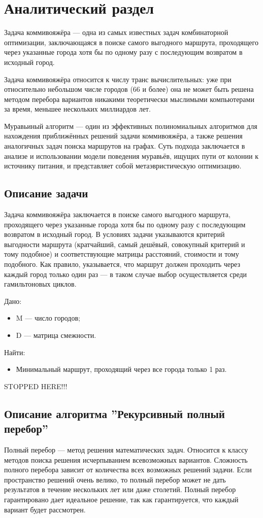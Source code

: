 \chapter{Аналитический раздел}
Задача коммивояжёра — одна из самых известных задач комбинаторной оптимизации, заключающаяся в поиске самого выгодного маршрута, проходящего через указанные города хотя бы по одному разу с последующим возвратом в исходный город.

Задача коммивояжёра относится к числу транс вычислительных: уже при относительно небольшом числе городов (66 и более) она не может быть решена методом перебора вариантов никакими теоретически мыслимыми компьютерами за время, меньшее нескольких миллиардов лет.

Муравьиный алгоритм — один из эффективных полиномиальных алгоритмов для нахождения приближённых решений задачи коммивояжёра, а также решения аналогичных задач поиска маршрутов на графах. Суть подхода заключается в анализе и использовании модели поведения муравьёв, ищущих пути от колонии к источнику питания, и представляет собой метаэвристическую оптимизацию.

\section{Описание задачи}
Задача коммивояжёра заключается в поиске самого выгодного маршрута, проходящего через указанные города хотя бы по одному разу с последующим возвратом в исходный город. В условиях задачи указываются критерий выгодности маршрута (кратчайший, самый дешёвый, совокупный критерий и тому подобное) и соответствующие матрицы расстояний, стоимости и тому подобного. Как правило, указывается, что маршрут должен проходить через каждый город только один раз — в таком случае выбор осуществляется среди гамильтоновых циклов.

Дано:
\begin{itemize}
	\item M — число городов;
	\item D — матрица смежности.
\end{itemize}
Найти:
\begin{itemize}
	\item Минимальный маршрут, проходящий через все города только 1 раз.
\end{itemize}

STOPPED HERE!!!

\section{Описание алгоритма ''Рекурсивный полный перебор''}
Полный перебор — метод решения математических задач. Относится к классу методов поиска решения исчерпыванием всевозможных вариантов. Сложность полного перебора зависит от количества всех возможных решений задачи. Если пространство решений очень велико, то полный перебор может не дать результатов в течение нескольких лет или даже столетий. Полный перебор гарантировано дает идеальное решение, так как гарантируется, что каждый вариант будет рассмотрен.

